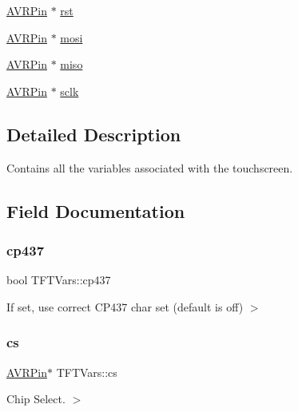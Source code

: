 \begin{DoxyCompactItemize}
\item 
\mbox{\hyperlink{struct_a_v_r_pin}{A\+V\+R\+Pin}} $\ast$ \mbox{\hyperlink{struct_t_f_t_vars_aa6a6519059e0590fa51bffc2de45da15}{rst}}
\item 
\mbox{\hyperlink{struct_a_v_r_pin}{A\+V\+R\+Pin}} $\ast$ \mbox{\hyperlink{struct_t_f_t_vars_acd8d54cf531c902adaf564d6375828f2}{mosi}}
\item 
\mbox{\hyperlink{struct_a_v_r_pin}{A\+V\+R\+Pin}} $\ast$ \mbox{\hyperlink{struct_t_f_t_vars_a0743c02a07fcf6c9f0189996d3fc88be}{miso}}
\item 
\mbox{\hyperlink{struct_a_v_r_pin}{A\+V\+R\+Pin}} $\ast$ \mbox{\hyperlink{struct_t_f_t_vars_ae4edb702d1738db936aa7adbfc5ce06c}{sclk}}
\end{DoxyCompactItemize}


\subsection{Detailed Description}
Contains all the variables associated with the touchscreen. 

\subsection{Field Documentation}
\mbox{\label{struct_t_f_t_vars_aad6b036182e1ca11b1856ac18f916407}} 
\subsubsection{\texorpdfstring{cp437}{cp437}}
{\footnotesize\ttfamily bool T\+F\+T\+Vars\+::cp437}

If set, use correct C\+P437 char set (default is off) $>$ \mbox{\label{struct_t_f_t_vars_a34d82933d6b232e82f57bcc42f045241}} 
\subsubsection{\texorpdfstring{cs}{cs}}
{\footnotesize\ttfamily \mbox{\hyperlink{struct_a_v_r_pin}{A\+V\+R\+Pin}}$\ast$ T\+F\+T\+Vars\+::cs}

Chip Select. $>$ \mbox{\label{struct_t_f_t_vars_aed18f303a7d3af8dc2a72d160fe8dcc2}} 
